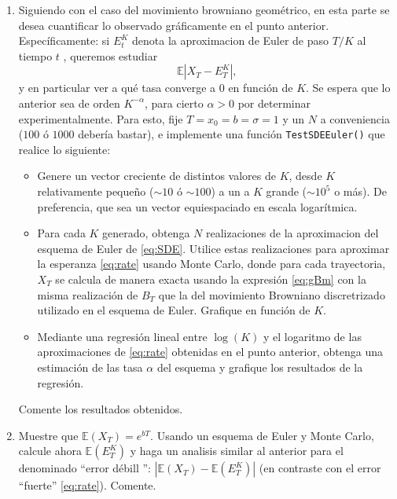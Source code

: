 \begin{enumerate}
\item Siguiendo con el caso del movimiento browniano geométrico, en esta parte se desea cuantificar lo observado gráficamente en el punto anterior. Específicamente: si $E_t^{K}$ denota la aproximacion de Euler de paso $T/K$ al tiempo $t$ , queremos estudiar
\begin{equation}
\label{eq:rate}
\mathbb{E} |X_T - E_T^K|,
\end{equation}
y en particular ver a qué tasa converge a 0 en función de $K$. Se espera que lo anterior sea de orden $K^{-\alpha}$, para cierto $\alpha >0$ por determinar experimentalmente. Para esto, fije $T=x_0=b=\sigma=1$ y un $N$ a conveniencia ($100$ ó $1000$ debería bastar), e implemente una función \texttt{TestSDEEuler()} que realice lo siguiente:
\begin{itemize}
\item Genere un vector creciente de distintos valores de $K$, desde $K$ relativamente pequeño ($\sim 10$ ó $\sim 100$) a un a $K$ grande ($\sim 10^5$ o m\'as). De preferencia, que sea un vector equiespaciado en escala logarítmica.
\item Para cada $K$ generado, obtenga $N$ realizaciones de la aproximacion del esquema de Euler de \eqref{eq:SDE}. Utilice estas realizaciones para aproximar la esperanza \eqref{eq:rate} usando Monte Carlo, donde para cada trayectoria,  $X_T$ se calcula de manera exacta usando la expresi\'on \eqref{eq:gBm} con la misma realizaci\'on de  $B_T$ que la del movimiento Browniano discretrizado utilizado en el esquema de Euler. Grafique en función de  $K$. 
\item Mediante una regresión lineal entre $\log(K)$ y el logaritmo de las aproximaciones de \eqref{eq:rate} obtenidas en el punto anterior, obtenga una estimación de las tasa $\alpha$ del esquema y grafique los resultados de la regresión.
\end{itemize}
Comente los resultados obtenidos.
\item Muestre que $\mathbb{E}(X_T)= e^{bT}$.  Usando un esquema de Euler y Monte Carlo, calcule ahora $\mathbb{E}(E_T^K)$ y haga un analisis similar al anterior para el denominado ``error d\'ebill '':   $| \mathbb{E}(X_T) - \mathbb{E}(E_T^K)|$   (en contraste con el error ``fuerte''   \eqref{eq:rate}).  Comente. 
\end{enumerate}


\vspace{1cm}\\
